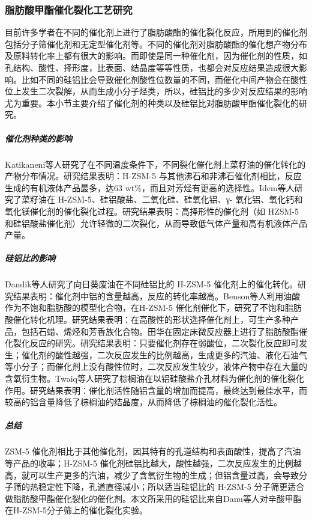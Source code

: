 \subsubsection{脂肪酸甲酯催化裂化工艺研究}
\par{目前许多学者在不同的催化剂上进行了脂肪酸酯的催化裂化反应，所用到的催化剂包括分子筛催化剂和无定型催化剂等。不同的催化剂对脂肪酸酯的催化想产物分布及原料转化率上都有很大的影响。而即使是同一种催化剂，因为催化剂的性质，如孔结构、酸性、择形度，比表面、结晶度等等性质，也都会对反应结果造成很大影响。比如不同的硅铝比会导致催化剂酸性位数量的不同，而催化中间产物会在酸性位上发生二次裂解，从而生成小分子烃类，所以，硅铝比的多少对反应结果的影响尤为重要。本小节主要介绍了催化剂的种类以及硅铝比对脂肪酸甲酯催化裂化的研究。}
\subparagraph{催化剂种类的影响}
\par{Katikaneni\cite{katikaneni_performance_1995}等人研究了在不同温度条件下，不同裂化催化剂上菜籽油的催化转化的产物分布情况。研究结果表明：H-ZSM-5 与其他沸石和非沸石催化剂相比，反应生成的有机液体产品最多，达63 wt\%，而且对芳烃有更高的选择性。Idem\cite{idem_catalytic_1997}等人研究了菜籽油在 H-ZSM-5、硅铝酸盐、二氧化硅、硅氧化铝、γ- 氧化铝、氧化钙和氧化镁催化剂的催化裂化过程。研究结果表明：高择形性的催化剂（如 HZSM-5 和硅铝酸盐催化剂）允许轻微的二次裂化，从而导致低气体产量和高有机液体产品产量。}
\subparagraph{硅铝比的影响}
\par{Dandik\cite{dandik1998catalytic}等人研究了向日葵废油在不同硅铝比的 H-ZSM-5 催化剂上的催化转化。研究结果表明：催化剂中铝的含量越高，反应的转化率越高。Benson\cite{benson2008heterogeneous}等人利用油酸作为不饱和脂肪酸的模型化合物，在H-ZSM-5 催化剂催化下，研究了不饱和脂肪酸催化转化机理。研究结果表明：在高酸性的形状选择催化剂上，可生产多种产品，包括石蜡、烯烃和芳香族化合物。田华\cite{脂肪酸酯的催化裂化研究}在固定床微反应器上进行了脂肪酸酯催化裂化反应的研究。研究结果表明：只要催化剂存在弱酸位，二次裂化反应即可发生；催化剂的酸性越强，二次反应发生的比例越高，生成更多的汽油、液化石油气等小分子；而催化剂上没有酸性位时，二次反应发生较少，液体产物中存在大量的含氧衍生物。Twaiq\cite{twaiq2003liquid}等人研究了棕榈油在以铝硅酸盐介孔材料为催化剂的催化裂化作用。研究结果表明：催化剂活性随铝含量的增加而提高，最终达到最佳水平，而较高的铝含量降低了棕榈油的结晶度，从而降低了棕榈油的催化裂化活性。}
\subparagraph{总结}
\par{ZSM-5 催化剂相比于其他催化剂，因其特有的孔道结构和表面酸性，提高了汽油等产品的收率；H-ZSM-5 催化剂硅铝比越大，酸性越强，二次反应发生的比例越高，就可以生产更多的汽油，减少了含氧衍生物的生成；但铝含量过高，会导致分子筛的热稳定性下降，孔道直径减小；所以适当硅铝比的 H-ZSM-5 分子筛更适合做脂肪酸甲酯催化裂化的催化剂。本文所采用的硅铝比来自Danu\cite{danuthai2009conversion}等人对辛酸甲酯在H-ZSM-5分子筛上的催化裂化实验。}
